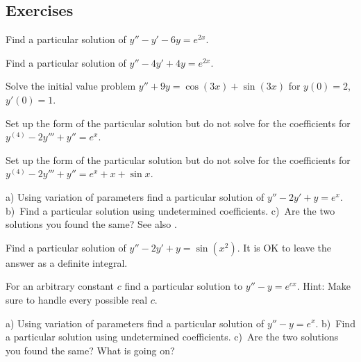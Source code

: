 \documentclass[12pt]{book}
\begin{document}
\subsection{Exercises}

\begin{exercise}
Find a particular solution of
$y''-y' -6y = e^{2x}$.
\end{exercise}

\begin{exercise}
Find a particular solution of
$y''-4y' +4y = e^{2x}$.
\end{exercise}

\begin{exercise}
Solve the initial value problem
$y''+9y = \cos (3x) + \sin (3x)$ for $y(0) = 2$, $y'(0) = 1$.
\end{exercise}

\begin{exercise}
Set up the form of the particular solution but do not solve
for the coefficients for $y^{(4)}-2y'''+y'' = e^x$.
\end{exercise}

\begin{exercise}
Set up the form of the particular solution but do not solve
for the coefficients for $y^{(4)}-2y'''+y'' = e^x + x + \sin x$.
\end{exercise}

\begin{exercise}
a) Using variation of parameters find a particular solution of
$y''-2y'+y = e^x$.  b)~Find a particular solution using undetermined
coefficients.  c)~Are the two solutions you found the same?
See also .
\end{exercise}

\begin{exercise}
Find a particular solution of
$y''-2y' +y = \sin (x^2)$.  It is OK to leave the answer as a definite
integral.
\end{exercise}

\begin{exercise}
For an arbitrary constant $c$ find a particular solution
to $y''-y=e^{cx}$.  Hint: Make sure to handle every possible real $c$.
\end{exercise}

\begin{exercise} \label{exercise:diffvarparunder}
a) Using variation of parameters find a particular solution of
$y''-y = e^x$.  b)~Find a particular solution using undetermined
coefficients.  c)~Are the two solutions you found the same?
What is going on?
\end{exercise}
\end{document}

